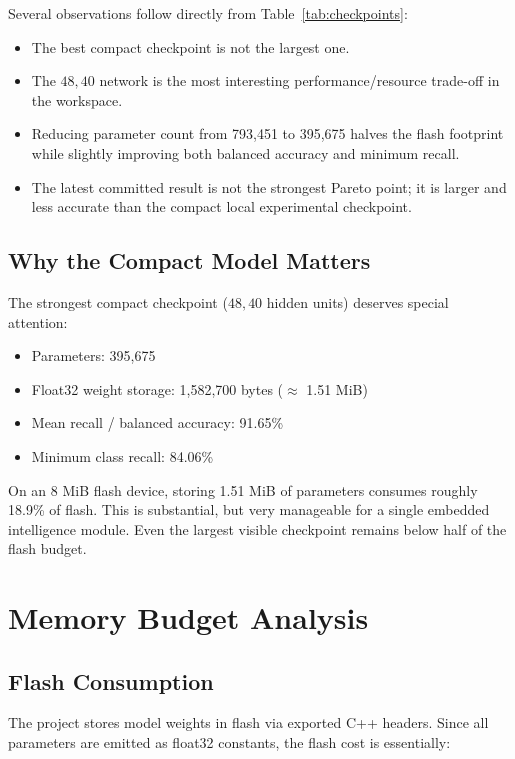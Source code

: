 \documentclass[11pt,a4paper]{article}
\begin{document}
Several observations follow directly from Table~\ref{tab:checkpoints}:

\begin{itemize}
    \item The best compact checkpoint is not the largest one.
    \item The \(48, 40\) network is the most interesting performance/resource trade-off in the workspace.
    \item Reducing parameter count from 793{,}451 to 395{,}675 halves the flash footprint while slightly improving both balanced accuracy and minimum recall.
    \item The latest committed result is not the strongest Pareto point; it is larger and less accurate than the compact local experimental checkpoint.
\end{itemize}

\subsection{Why the Compact Model Matters}

The strongest compact checkpoint (\(48, 40\) hidden units) deserves special attention:

\begin{itemize}
    \item Parameters: 395{,}675
    \item Float32 weight storage: 1{,}582{,}700 bytes (\(\approx\) 1.51 MiB)
    \item Mean recall / balanced accuracy: 91.65\%
    \item Minimum class recall: 84.06\%
\end{itemize}

On an 8 MiB flash device, storing 1.51 MiB of parameters consumes roughly 18.9\% of flash. This is substantial, but very manageable for a single embedded intelligence module. Even the largest visible checkpoint remains below half of the flash budget.

\section{Memory Budget Analysis}

\subsection{Flash Consumption}

The project stores model weights in flash via exported C++ headers. Since all parameters are emitted as float32 constants, the flash cost is essentially:
\end{document}

